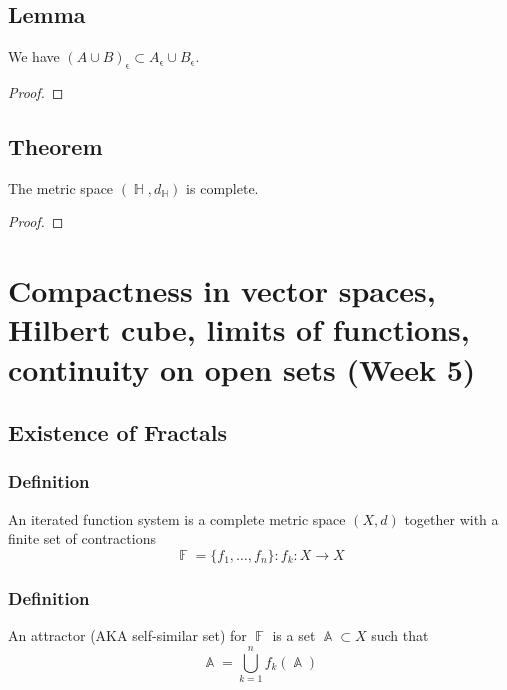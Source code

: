\documentclass{article}
\DeclareMathOperator\eps{\epsilon}
\DeclareMathOperator\F{\mathbb{F}}
\DeclareMathOperator\A{\mathbb{A}}
\DeclareMathOperator\HH{\mathbb{H}}
\begin{document}
\subsection*{Lemma}
We have $(A \cup B)_{\eps} \subset A_{\eps} \cup B_{\eps}$.
\begin{proof}
\end{proof}
\subsection*{Theorem}
The metric space $(\HH,d_{\HH})$ is complete.
\begin{proof}
\end{proof}
\section*{Compactness in vector spaces, Hilbert cube, limits of functions, continuity on open sets (Week 5)}
\subsection*{Existence of Fractals}
\subsubsection*{Definition}
An iterated function system is a complete metric space $(X,d)$
together with a finite set of contractions $$
\F = \{f_1,\hdots,f_n \}: f_k:X \to X
$$
\subsubsection*{Definition}
An attractor (AKA self-similar set) for $\F$ is a set $\A \subset X$ such that $$
\A = \bigcup_{k=1}^n f_k(\A)
$$
\end{document}
